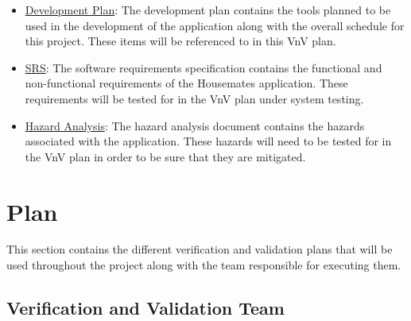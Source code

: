 \documentclass[12pt, titlepage]{article}
\begin{document}
\begin{itemize}
    \item \href{https://github.com/DangJustin/CapstoneProject/blob/main/docs/DevelopmentPlan/DevelopmentPlan.pdf}{Development Plan}: The development plan contains the tools planned to be used in the development of the application along with the overall schedule for this project. These items will be referenced to in this VnV plan.  
    \item \href{https://github.com/DangJustin/CapstoneProject/blob/main/docs/SRS-Volere/SRS.pdf}{SRS}: The software requirements specification contains the functional and non-functional requirements of the Housemates application. These requirements will be tested for in the VnV plan under system testing. 
    \item \href{https://github.com/DangJustin/CapstoneProject/blob/main/docs/HazardAnalysis/HazardAnalysis.pdf}{Hazard Analysis}: The hazard analysis document contains the hazards associated with the application. These hazards will need to be tested for in the VnV plan in order to be sure that they are mitigated.
\end{itemize}




\section{Plan}

This section contains the different verification and validation plans that will be used throughout the project along with the team responsible for executing them.  


\subsection{Verification and Validation Team}
\end{document}
